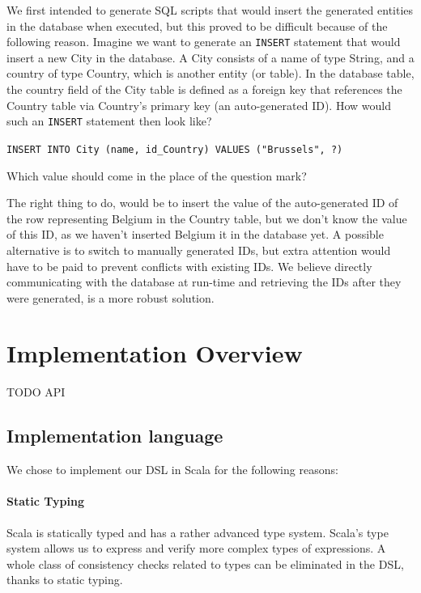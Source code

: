 \documentclass[a4paper]{article}
\newcommand{\cc}[1]{\texttt{#1}}
\begin{document}
We first intended to generate SQL scripts that would insert the generated entities in the database when executed, but this proved to be difficult because of the following reason.
Imagine we want to generate an \cc{INSERT} statement that would insert a new City in the database.
A City consists of a name of type String, and a country of type Country, which is another entity (or table).
In the database table, the country field of the City table is defined as a foreign key that references the Country table via Country's primary key (an auto-generated ID).
How would such an \cc{INSERT} statement then look like?

\cc{INSERT INTO City (name, id\_Country) VALUES ("Brussels", ?)}

Which value should come in the place of the question mark?

The right thing to do, would be to insert the value of the auto-generated ID of the row representing Belgium in the Country table, but we don't know the value of this ID, as we haven't inserted Belgium it in the database yet.
A possible alternative is to switch to manually generated IDs, but extra attention would have to be paid to prevent conflicts with existing IDs.
We believe directly communicating with the database at run-time and retrieving the IDs after they were generated, is a more robust solution.


\section{Implementation Overview}
\label{sec:implementation-overview}



TODO API

\subsection{Implementation language}
\label{sec:implementation-language}

We chose to implement our DSL in Scala for the following reasons:

\paragraph{Static Typing}
Scala is statically typed and has a rather advanced type system.
Scala's type system allows us to express and verify more complex types of expressions.
A whole class of consistency checks related to types can be eliminated in the DSL, thanks to static typing.
\end{document}
